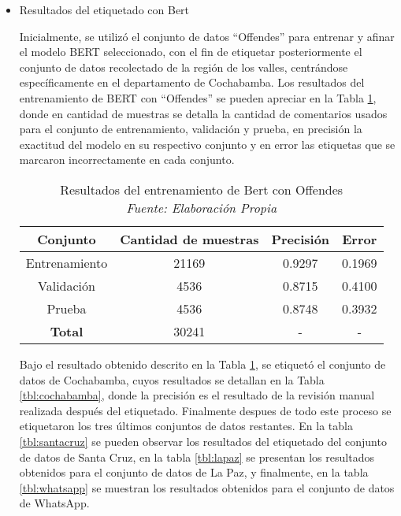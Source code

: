 \begin{itemize}
 \item{Resultados del etiquetado con Bert}

Inicialmente, se utilizó el conjunto de datos ``Offendes'' para entrenar y afinar  el modelo BERT seleccionado, con el fin de etiquetar posteriormente el conjunto de datos recolectado de la región de los valles, centrándose específicamente en el departamento de Cochabamba. Los resultados del entrenamiento de BERT con ``Offendes'' se pueden apreciar en la Tabla \ref{tbl:bert}, donde en cantidad de muestras se detalla la cantidad de comentarios usados para el conjunto de entrenamiento, validación y prueba, en precisión la exactitud del modelo en su respectivo conjunto y en error las etiquetas que se marcaron incorrectamente en cada conjunto.

\begin{table}[!ht]
	\centering
	\begin{tabular}{|c|c|c|c|}
		\hline
		\textbf{Conjunto} & \textbf{Cantidad de muestras} & \textbf{Precisión} & \textbf{Error} \\ \hline
		Entrenamiento & 21169 & 0.9297 & 0.1969 \\ 
		Validación & 4536 & 0.8715 & 0.4100 \\ 
		Prueba & 4536 & 0.8748 & 0.3932 \\ \hline
		\textbf{Total} & 30241 & - & - \\ \hline
	\end{tabular}
	\caption{Resultados del entrenamiento de Bert con Offendes
		\\\textit{Fuente: Elaboración Propia}}
	\label{tbl:bert}
\end{table}


Bajo el resultado obtenido descrito en la Tabla \ref{tbl:bert}, se etiquetó el conjunto de datos de Cochabamba, cuyos resultados se detallan en la Tabla \ref{tbl:cochabamba}, donde la precisión es el resultado de la revisión manual realizada después del etiquetado. Finalmente despues de todo este proceso se etiquetaron los tres últimos conjuntos de datos restantes. En la tabla \ref{tbl:santacruz} se pueden observar los resultados del etiquetado del conjunto de datos de Santa Cruz, en la tabla \ref{tbl:lapaz} se presentan los resultados obtenidos para el conjunto de datos de La Paz, y finalmente, en la tabla \ref{tbl:whatsapp} se muestran los resultados obtenidos para el conjunto de datos de WhatsApp.



\end{itemize}
